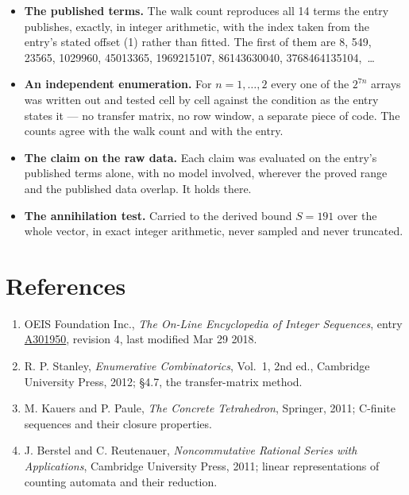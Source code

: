 \documentclass[11pt]{article}
\theoremstyle{definition}
\begin{document}
\begin{itemize}

\item {\bfseries The published terms.} The walk count reproduces all 14 terms the entry publishes, exactly, in integer arithmetic, with the index taken from the entry's stated offset (1) rather than fitted. The first of them are 8, 549, 23565, 1029960, 45013365, 1969215107, 86143630040, 3768464135104,~\dots

\item {\bfseries An independent enumeration.} For $n = 1,\dots,2$ every one of the $2^{7n}$ arrays was written out and tested cell by cell against the condition as the entry states it --- no transfer matrix, no row window, a separate piece of code. The counts agree with the walk count and with the entry.

\item {\bfseries The claim on the raw data.} Each claim was evaluated on the entry's published terms alone, with no model involved, wherever the proved range and the published data overlap. It holds there.

\item {\bfseries The annihilation test.} Carried to the derived bound $S = 191$ over the whole vector, in exact integer arithmetic, never sampled and never truncated.

\end{itemize}

\section{References}

\begin{enumerate}

\item OEIS Foundation Inc., \emph{The On-Line Encyclopedia of Integer Sequences}, entry \href{https://oeis.org/A301950}{A301950}, revision 4, last modified Mar 29 2018.

\item R. P. Stanley, \emph{Enumerative Combinatorics}, Vol.~1, 2nd ed., Cambridge University Press, 2012; \S4.7, the transfer-matrix method.

\item M. Kauers and P. Paule, \emph{The Concrete Tetrahedron}, Springer, 2011; C-finite sequences and their closure properties.

\item J. Berstel and C. Reutenauer, \emph{Noncommutative Rational Series with Applications}, Cambridge University Press, 2011; linear representations of counting automata and their reduction.

\end{enumerate}
\end{document}
